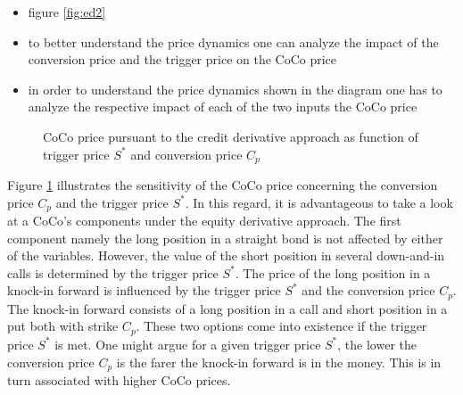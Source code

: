   \begin{itemize}
  \item figure \ref{fig:ed2}
    \item to better understand the price dynamics one can analyze the impact of the conversion price and the trigger price on the CoCo price
  
  
  \item in order to understand the price dynamics shown in the diagram one has to analyze the respective impact of each of the two inputs the CoCo price
  \end{itemize}
  
\begin{figure}[H]
\centering
    \caption[CoCo price pursuant to the equity derivative approach as function of trigger price and conversion price]{CoCo price pursuant to the credit derivative approach as function of trigger price $S^*$ and conversion price $C_p$}
  \label{fig:ed3}
  \end{figure}
  
Figure \ref{fig:ed3} illustrates the sensitivity of the CoCo price concerning the conversion price $C_p$ and the trigger price $S^*$. In this regard, it is advantageous to take a look at a CoCo's components under the equity derivative approach. The first component namely the long position in a straight bond is not affected by either of the variables. However, the value of the short position in several down-and-in calls is determined by the trigger price $S^*$. The price of the long position in a knock-in forward is influenced by the trigger price $S^*$ and the conversion price $C_p$. The knock-in forward consists of a long position in a call and short position in a put both with strike $C_p$. These two options come into existence if the trigger price $S^*$ is met. One might argue for a given trigger price $S^*$, the lower the conversion price $C_p$ is the farer the knock-in forward is in the money. This is in turn associated with higher CoCo prices. 


